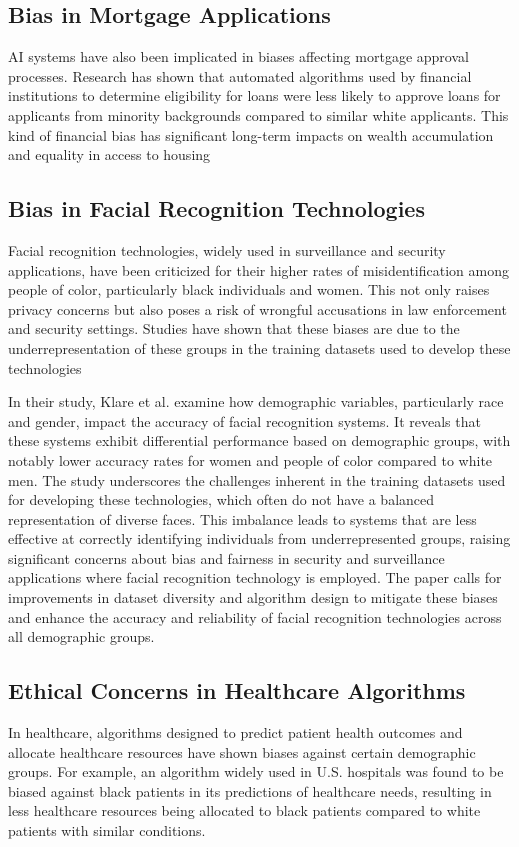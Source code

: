 \subsection{Bias in Mortgage Applications}
AI systems have also been implicated in biases affecting mortgage approval processes. Research has shown that automated algorithms used by financial institutions to determine eligibility for loans were less likely to approve loans for applicants from minority backgrounds compared to similar white applicants. This kind of financial bias has significant long-term impacts on wealth accumulation and equality in access to housing \cite{Bartlett_Morse_Stanton_Wallace_2022}

\subsection{Bias in Facial Recognition Technologies}
Facial recognition technologies, widely used in surveillance and security applications, have been criticized for their higher rates of misidentification among people of color, particularly black individuals and women. This not only raises privacy concerns but also poses a risk of wrongful accusations in law enforcement and security settings. Studies have shown that these biases are due to the underrepresentation of these groups in the training datasets used to develop these technologies \cite{Buolamwini_Gebru_2018}

In their study, Klare et al. \cite{Klare_Burge_Klontz_Vorder_Bruegge_Jain_2012} examine how demographic variables, particularly race and gender, impact the accuracy of facial recognition systems. It reveals that these systems exhibit differential performance based on demographic groups, with notably lower accuracy rates for women and people of color compared to white men. The study underscores the challenges inherent in the training datasets used for developing these technologies, which often do not have a balanced representation of diverse faces. This imbalance leads to systems that are less effective at correctly identifying individuals from underrepresented groups, raising significant concerns about bias and fairness in security and surveillance applications where facial recognition technology is employed. The paper calls for improvements in dataset diversity and algorithm design to mitigate these biases and enhance the accuracy and reliability of facial recognition technologies across all demographic groups.

\subsection{Ethical Concerns in Healthcare Algorithms}
In healthcare, algorithms designed to predict patient health outcomes and allocate healthcare resources have shown biases against certain demographic groups. For example, an algorithm widely used in U.S. hospitals was found to be biased against black patients in its predictions of healthcare needs, resulting in less healthcare resources being allocated to black patients compared to white patients with similar conditions. \cite{Obermeyer_Powers_Vogeli_Mullainathan_2019}

